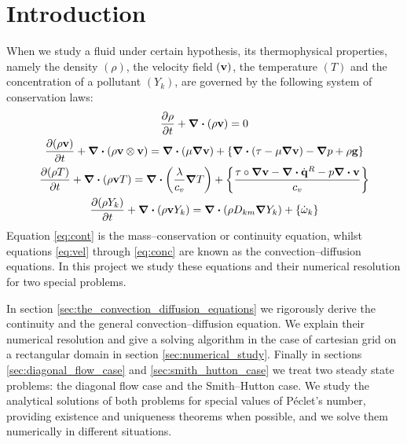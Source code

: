 
\section{Introduction}

When we study a fluid under certain hypothesis, its thermophysical properties, namely the density
$(\rho)$, the velocity field $(\vb{v})$, the temperature $(T)$ and the
concentration of a pollutant $(Y_k)$, are governed by the following system of conservation laws:
\begin{gather}
    \pdv{\rho}{t} + \div(\rho \vb{v}) = 0 \label{eq:cont} \\
    \pdv{(\rho \vb{v})}{t} + \div(\rho \vb{v} \otimes \vb{v}) = 
	\div(\mu \grad{\vb{v}}) + 
    \left\{ \div(\vb{\tau - \mu \grad{\vb{v}}}) - \grad{p} + \rho \vb{g} \right\} \label{eq:vel}\\
	\pdv{(\rho T)}{t} + \div(\rho \vb{v} T) = 
	\div(\frac{\lambda}{c_v} \grad{T}) + 
	\left\{ \frac{\vb{\tau} \circ \grad{\vb{v}} - \div{\dot{\vb{q}}^R} - p \div{\vb{v}}}{c_v}\right\} \\
	\pdv{(\rho Y_k)}{t} + \div(\rho \vb{v} Y_k) = 
	\div(\rho D_{km} \grad{Y_k}) + \left\{ \dot{\omega}_k \right\} \label{eq:conc}
\end{gather}
Equation \eqref{eq:cont} is the mass--conservation or continuity equation,
whilst equations \eqref{eq:vel} through \eqref{eq:conc} are known as the
convection--diffusion equations. In this project we study these equations and
their numerical resolution for two special problems.

In section \ref{sec:the_convection_diffusion_equations} we rigorously derive the
continuity and the general convection--diffusion equation. We explain their
numerical resolution and give a solving algorithm in the case of cartesian grid
on a rectangular domain in section \ref{sec:numerical_study}. Finally in
sections \ref{sec:diagonal_flow_case} and \ref{sec:smith_hutton_case} we treat
two steady state problems: the diagonal flow case and the Smith--Hutton case. We
study the analytical solutions of both problems for special values of Péclet's
number, providing existence and uniqueness theorems when possible, and we solve
them numerically in different situations. 



